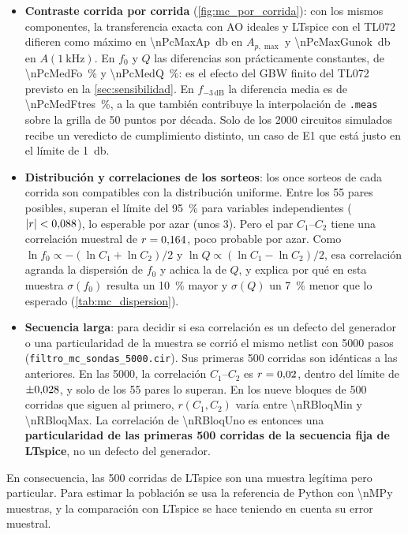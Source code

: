 \begin{itemize}
  \item \textbf{Contraste corrida por corrida} (\cref{fig:mc_por_corrida}): con los mismos componentes, la transferencia exacta con AO ideales y
        LTspice con el TL072 difieren como máximo en \qty{\nPcMaxAp}{\decibel} en $A_{p,\max}$ y \qty{\nPcMaxGunok}{\decibel} en
        $A(\qty{1}{\kilo\hertz})$. En $f_0$ y $Q$ las diferencias son prácticamente constantes, de \qty{\nPcMedFo}{\percent} y
        \qty{\nPcMedQ}{\percent}: es el efecto del GBW finito del TL072 previsto en la \cref{sec:sensibilidad}. En $f_{-3\,\text{dB}}$ la diferencia
        media es de \qty{\nPcMedFtres}{\percent}, a la que también contribuye la interpolación de \texttt{.meas} sobre la grilla de 50 puntos por
        década. Solo \nPcVeredictos{} de los \num{2000} circuitos simulados recibe un veredicto de cumplimiento distinto, un caso de E1 que está
        justo en el límite de \qty{1}{\decibel}.
  \item \textbf{Distribución y correlaciones de los sorteos}: los once sorteos de cada corrida son compatibles con la distribución uniforme. Entre los
        55 pares posibles, \nParesFuera{} superan el límite del \qty{95}{\percent} para variables independientes ($|r| < \num{0.088}$), lo
        esperable por azar (unos 3). Pero el par $C_1$--$C_2$ tiene una correlación muestral de $r = \num{0.164}$, poco probable por azar.
        Como $\ln f_0 \propto -(\ln C_1 + \ln C_2)/2$ y $\ln Q \propto (\ln C_1 - \ln C_2)/2$, esa correlación agranda la dispersión de $f_0$ y
        achica la de $Q$, y explica por qué en esta muestra $\sigma(f_0)$ resulta un \qty{10}{\percent} mayor y $\sigma(Q)$ un \qty{7}{\percent}
        menor que lo esperado (\cref{tab:mc_dispersion}).
  \item \textbf{Secuencia larga}: para decidir si esa correlación es un defecto del generador o una particularidad de la muestra se corrió el mismo
        netlist con \num{5000} pasos (\texttt{filtro\_mc\_sondas\_5000.cir}). Sus primeras 500 corridas son idénticas a las anteriores. En las
        \num{5000}, la correlación $C_1$--$C_2$ es $r = \num{0.02}$, dentro del límite de $\pm\num{0.028}$, y solo
        \nParesFueraLargo{} de los 55 pares lo superan. En los nueve bloques de 500 corridas que siguen al primero, $r(C_1, C_2)$ varía entre
        \num{\nRBloqMin} y \num{\nRBloqMax}. La correlación de \num{\nRBloqUno} es entonces una \textbf{particularidad de las primeras 500 corridas
        de la secuencia fija de LTspice}, no un defecto del generador.
\end{itemize}
En consecuencia, las 500 corridas de LTspice son una muestra legítima pero particular. Para estimar la población se usa la referencia de Python
con \num{\nMPy} muestras, y la comparación con LTspice se hace teniendo en cuenta su error muestral.


